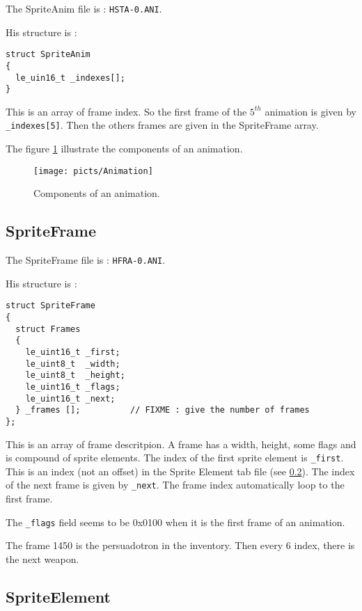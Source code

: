 \documentclass[a4paper,twoside,12pt,dvips]{article}
\begin{document}
The SpriteAnim file is : \texttt{HSTA-0.ANI}.

His structure is :

\begin{lstlisting}
struct SpriteAnim
{
  le_uin16_t _indexes[];
}
\end{lstlisting}

This is an array of frame index. So the first frame of the $5^{th}$ animation is given by \texttt{\_indexes[5]}. Then the others frames are given in the SpriteFrame array.

The figure \ref{fig:spriteanim} illustrate the components of an animation.

\begin{figure}[htbp]
  \texttt{[image: picts/Animation]}\centering 
  \caption{Components of an animation.}
  \label{fig:spriteanim}
\end{figure}

\subsection{SpriteFrame}
\label{sec:spriteframe}

The SpriteFrame file is : \texttt{HFRA-0.ANI}.

His structure is :

\begin{lstlisting}
struct SpriteFrame
{
  struct Frames
  {
    le_uint16_t _first;
    le_uint8_t  _width;
    le_uint8_t  _height;
    le_uint16_t _flags;
    le_uint16_t _next;
  } _frames [];          // FIXME : give the number of frames
};
\end{lstlisting}

This is an array of frame descritpion. A frame has a width, height, some flags and is compound of sprite elements. The index of the first sprite element is \texttt{\_first}. This is an index (not an offset) in the Sprite Element tab file (see \ref{sec:spriteelement}). The index of the next frame is given by \texttt{\_next}. The frame index automatically loop to the first frame.

The \texttt{\_flags} field seems to be 0x0100 when it is the first frame of an animation.

The frame 1450 is the persuadotron in the inventory. Then every 6 index, there is the next weapon.

\subsection{SpriteElement}
\label{sec:spriteelement}
\end{document}
